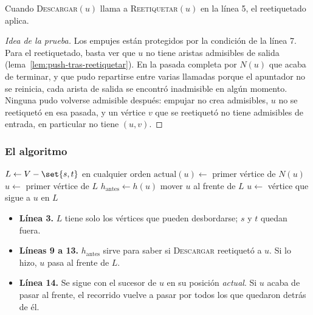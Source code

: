 \documentclass[11pt,letterpaper]{article}
\begin{document}
\begin{lema}
  \label{lem:push-descargar-valido}
  Cuando \textsc{Descargar}$(u)$ llama a \textsc{Reetiquetar}$(u)$ en
  la línea 5, el reetiquetado aplica.
\end{lema}

\begin{proof}[Idea de la prueba]
  Los empujes están protegidos por la condición de la línea 7. Para el
  reetiquetado, basta ver que $u$ no tiene aristas admisibles de salida
  (lema~\ref{lem:push-tras-reetiquetar}). En la pasada completa por
  $N(u)$ que acaba de terminar, y que pudo repartirse entre varias
  llamadas porque el apuntador no se reinicia, cada arista de salida se
  encontró inadmisible en algún momento. Ninguna pudo volverse
  admisible después: empujar no crea admisibles, $u$ no se reetiquetó
  en esa pasada, y un vértice $v$ que se reetiquetó no tiene
  admisibles de entrada, en particular no tiene $(u, v)$.
\end{proof}

\subsubsection*{El algoritmo}

\begin{algorithm}[H]
\caption{\textsc{Reetiquetar-al-Frente}$(G, s, t)$
         \ (\textsc{Relabel-To-Front} en Cormen)}
\label{alg:reetiquetar-al-frente}
\begin{algorithmic}[1]
  \State {}
  \State $L \gets V - \set{s, t}$ en cualquier orden
    \State $\text{actual}(u) \gets$ primer vértice de $N(u)$
  \EndFor
  \State $u \gets$ primer vértice de $L$
    \State $h_{\text{antes}} \gets h(u)$
    \State {}
     
      \State mover $u$ al frente de $L$
    \EndIf
    \State $u \gets$ vértice que sigue a $u$ en $L$
  \EndWhile
\EndProcedure
\end{algorithmic}
\end{algorithm}

\begin{itemize}
  \item \textbf{Línea 3.} $L$ tiene solo los vértices que pueden
        desbordarse; $s$ y $t$ quedan fuera.
  \item \textbf{Líneas 9 a 13.} $h_{\text{antes}}$ sirve para saber si
        \textsc{Descargar} reetiquetó a $u$. Si lo hizo, $u$ pasa al
        frente de $L$.
  \item \textbf{Línea 14.} Se sigue con el sucesor de $u$ en su posición
        \emph{actual}. Si $u$ acaba de pasar al frente, el recorrido
        vuelve a pasar por todos los que quedaron detrás de él.
\end{itemize}
\end{document}
